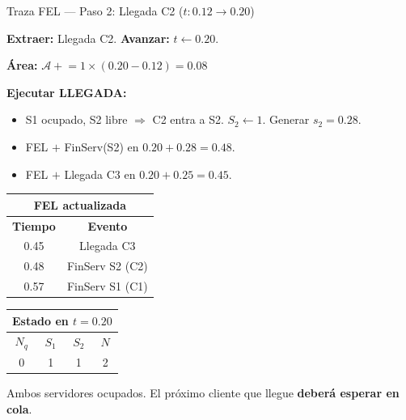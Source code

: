\documentclass[aspectratio=1610, 9pt]{beamer}
\begin{document}
\begin{frame}{Traza FEL --- Paso 2: Llegada C2 ($t: 0.12 \to 0.20$)}

\textbf{Extraer:} Llegada C2. \quad \textbf{Avanzar:} $t \leftarrow 0.20$.

\textbf{Área:} $\mathcal{A} \mathrel{+}= 1 \times (0.20 - 0.12) = 0.08$

\textbf{Ejecutar LLEGADA:}
\begin{itemize}
    \item S1 ocupado, S2 libre $\Rightarrow$ C2 entra a S2. $S_2 \leftarrow 1$. Generar $s_2 = 0.28$.
    \item \textcolor{verdeoscuro}{FEL $+$} FinServ(S2) en $0.20 + 0.28 = 0.48$.
    \item \textcolor{verdeoscuro}{FEL $+$} Llegada C3 en $0.20 + 0.25 = 0.45$.
\end{itemize}

\vspace{0.15cm}
\begin{center}
\renewcommand{\arraystretch}{1.3}
\begin{tabular}{|c|c|}
\hline
\multicolumn{2}{|c|}{\cellcolor{azuloscuro!15}\textbf{FEL actualizada}} \\
\hline
\textbf{Tiempo} & \textbf{Evento} \\
\hline
\rowcolor{yellow!20} 0.45 & Llegada C3 \\
0.48 & FinServ S2 (C2) \\
0.57 & FinServ S1 (C1) \\
\hline
\end{tabular}
\hspace{1.5cm}
\begin{tabular}{|c|c|c|c|}
\hline
\multicolumn{4}{|c|}{\cellcolor{grisclaro}\textbf{Estado en $t=0.20$}} \\
\hline
$N_q$ & $S_1$ & $S_2$ & $N$ \\
\hline
0 & \cellcolor{blue!15}1 & \cellcolor{red!15}1 & 2 \\
\hline
\end{tabular}
\end{center}

\small Ambos servidores ocupados. El próximo cliente que llegue \textbf{deberá esperar en cola}.
\end{frame}
\end{document}
